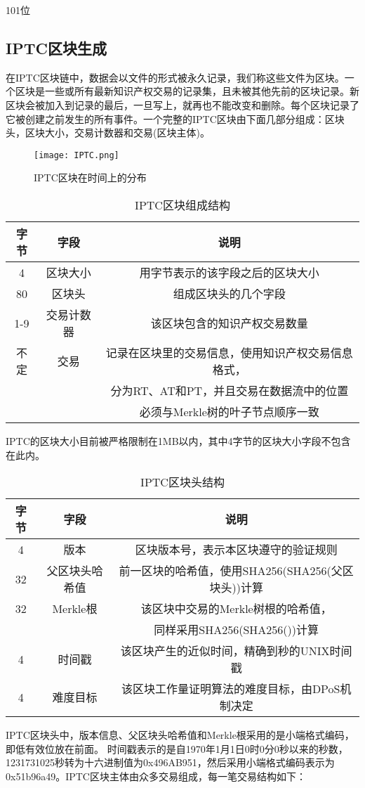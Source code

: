 \documentclass[withoutpreface,bwprint]{cumcmthesis} %
\begin{document}
101位




\subsection{IPTC区块生成}


在IPTC区块链中，数据会以文件的形式被永久记录，我们称这些文件为区块。一个区块是一些或所有最新知识产权交易的记录集，且未被其他先前的区块记录。新区块会被加入到记录的最后，一旦写上，就再也不能改变和删除。每个区块记录了它被创建之前发生的所有事件。一个完整的IPTC区块由下面几部分组成：区块头，区块大小，交易计数器和交易(区块主体)。

\begin{figure}[!h]
	\centering
	\texttt{[image: IPTC.png]}
	\caption{IPTC区块在时间上的分布}
\end{figure}

\begin{table}[h]
	\caption{IPTC区块组成结构}\label{tab001} \centering
	\begin{tabular}{ccc}
		\toprule[1.5pt]
		字节 & 字段 & 说明 \\
		\midrule[1pt]
		4 & 区块大小 & 用字节表示的该字段之后的区块大小\\
		80 & 区块头 & 组成区块头的几个字段\\
		1-9 & 交易计数器 & 该区块包含的知识产权交易数量\\
		不定 & 交易 & 记录在区块里的交易信息，使用知识产权交易信息格式，\\
		& & 分为RT、AT和PT，并且交易在数据流中的位置\\
		& & 必须与Merkle树的叶子节点顺序一致\\
		\bottomrule[1.5pt]
	\end{tabular}
\end{table}
IPTC的区块大小目前被严格限制在1MB以内，其中4字节的区块大小字段不包含在此内。

\newpage

\begin{table}[h]
	\caption{IPTC区块头结构}\label{tab001} \centering
	\begin{tabular}{ccc}
		\toprule[1.5pt]
		字节 & 字段 & 说明 \\
		\midrule[1pt]
		4 & 版本 & 区块版本号，表示本区块遵守的验证规则\\
		32 & 父区块头哈希值 & 前一区块的哈希值，使用SHA256(SHA256(父区块头))计算\\
		32 & Merkle根 & 该区块中交易的Merkle树根的哈希值，\\
		& & 同样采用SHA256(SHA256())计算\\
		4 & 时间戳 & 该区块产生的近似时间，精确到秒的UNIX时间戳\\
		4 & 难度目标 & 该区块工作量证明算法的难度目标，由DPoS机制决定\\
		\bottomrule[1.5pt]
	\end{tabular}
\end{table}
IPTC区块头中，版本信息、父区块头哈希值和Merkle根采用的是小端格式编码，即低有效位放在前面。
时间戳表示的是自1970年1月1日0时0分0秒以来的秒数，1231731025秒转为十六进制值为0x496AB951，然后采用小端格式编码表示为0x51b96a49。IPTC区块主体由众多交易组成，每一笔交易结构如下：
\end{document}
